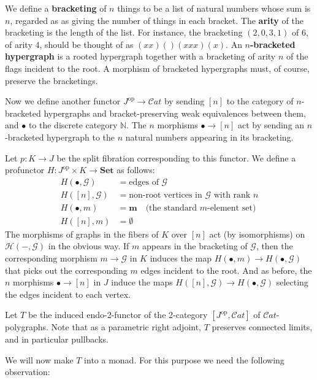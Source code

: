 \documentclass{article}
\theoremstyle{definition}
\theoremstyle{remark}
\def\G{\mathcal{G}}
\def\H{\mathcal{H}}
\def\Set{\mathbf{Set}}
\def\Cat{\ensuremath{\mathcal{C}\mathit{at}}}
\def\cpg{\ensuremath{\mathcal{CPG}}\xspace}
\def\op{^{\mathrm{op}}}
\def\N{\mathbb{N}}
\begin{document}
We define a \textbf{bracketing} of $n$ things to be a list of natural numbers whose sum is $n$, regarded as as giving the number of things in each bracket.
The \textbf{arity} of the bracketing is the length of the list.
For instance, the bracketing $(2,0,3,1)$ of $6$, of arity $4$, should be thought of as $(xx)()(xxx)(x)$.
An \textbf{$n$-bracketed hypergraph} is a rooted hypergraph together with a bracketing of arity $n$ of the flags incident to the root.
A morphism of bracketed hypergraphs must, of course, preserve the bracketings.

Now we define another functor $J\op\to\Cat$ by sending $[n]$ to the category of $n$-bracketed hypergraphs and bracket-preserving weak equivalences between them, and $\bullet$ to the discrete category $\N$.
The $n$ morphisms $\bullet \to [n]$ act by sending an $n$-bracketed hypergraph to the $n$ natural numbers appearing in its bracketing.

Let $p:K \to J$ be the split fibration corresponding to this functor.
We define a profunctor $H : J\op\times K \to \Set$ as follows:
\begin{align*}
  H(\bullet,\G) &= \text{edges of $\G$}\\
  H([n],\G) &= \text{non-root vertices in $\G$ with rank $n$}\\
  H(\bullet,m) &= \mathbf{m} \quad\text{(the standard $m$-element set)}\\
  H([n],m) &= \emptyset
\end{align*}
The morphisms of graphs in the fibers of $K$ over $[n]$ act (by isomorphisms) on $\H(-,\G)$ in the obvious way.
If $m$ appears in the bracketing of $\G$, then the corresponding morphism $m\to\G$ in $K$ induces the map $H(\bullet,m) \to H(\bullet,\G)$ that picks out the corresponding $m$ edges incident to the root.
And as before, the $n$ morphisms $\bullet\to [n]$ in $J$ induce the maps $H([n],\G) \to H(\bullet,\G)$ selecting the edges incident to each vertex.

Let $T$ be the induced endo-2-functor of the 2-category $[J\op,\Cat]$ of \Cat-polygraphs. %
Note that as a parametric right adjoint, $T$ preserves connected limits, and in particular pullbacks.

We will now make $T$ into a monad.
For this purpose we need the following observation:
\end{document}
